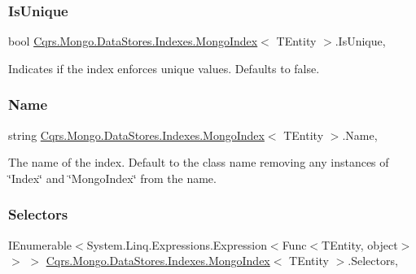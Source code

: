 \subsubsection{\texorpdfstring{Is\+Unique}{IsUnique}}
{\footnotesize\ttfamily bool \hyperlink{classCqrs_1_1Mongo_1_1DataStores_1_1Indexes_1_1MongoIndex}{Cqrs.\+Mongo.\+Data\+Stores.\+Indexes.\+Mongo\+Index}$<$ T\+Entity $>$.Is\+Unique\hspace{0.3cm}{\ttfamily [get]}, {}}



Indicates if the index enforces unique values. Defaults to false. 

\mbox{\label{classCqrs_1_1Mongo_1_1DataStores_1_1Indexes_1_1MongoIndex_a635b552b98a7638ca3a474e54652fde6_a635b552b98a7638ca3a474e54652fde6}} 
\subsubsection{\texorpdfstring{Name}{Name}}
{\footnotesize\ttfamily string \hyperlink{classCqrs_1_1Mongo_1_1DataStores_1_1Indexes_1_1MongoIndex}{Cqrs.\+Mongo.\+Data\+Stores.\+Indexes.\+Mongo\+Index}$<$ T\+Entity $>$.Name\hspace{0.3cm}{\ttfamily [get]}, {}}



The name of the index. Default to the class name removing any instances of \char`\"{}\+Index\char`\"{} and \char`\"{}\+Mongo\+Index\char`\"{} from the name. 

\mbox{\label{classCqrs_1_1Mongo_1_1DataStores_1_1Indexes_1_1MongoIndex_a43e73501f54becfaee4430a89841055a_a43e73501f54becfaee4430a89841055a}} 
\subsubsection{\texorpdfstring{Selectors}{Selectors}}
{\footnotesize\ttfamily I\+Enumerable$<$System.\+Linq.\+Expressions.\+Expression$<$Func$<$T\+Entity, object$>$ $>$ $>$ \hyperlink{classCqrs_1_1Mongo_1_1DataStores_1_1Indexes_1_1MongoIndex}{Cqrs.\+Mongo.\+Data\+Stores.\+Indexes.\+Mongo\+Index}$<$ T\+Entity $>$.Selectors\hspace{0.3cm}{\ttfamily [get]}, {}}

